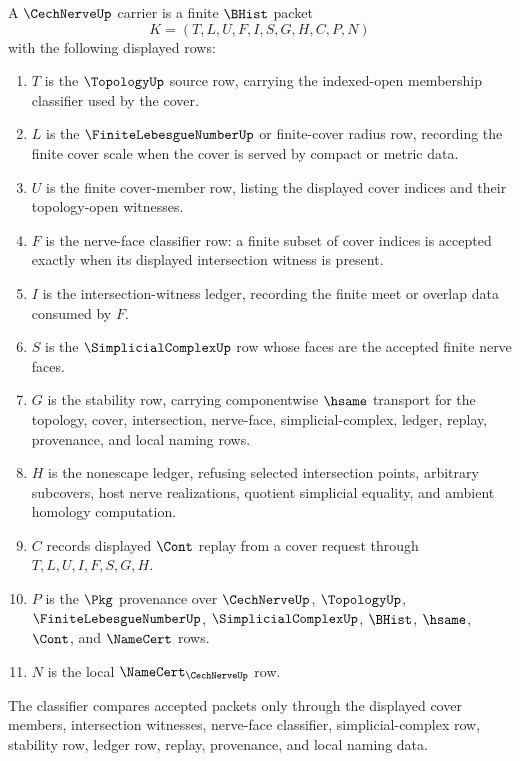 \begin{definition}
\label{def:cech-nerve-carrier}
A $\CechNerveUp$ carrier is a finite $\BHist$ packet
$$
K=(T,L,U,F,I,S,G,H,C,P,N)
$$
with the following displayed rows:
\begin{enumerate}
\item $T$ is the $\TopologyUp$ source row, carrying the indexed-open membership classifier used by the cover.
\item $L$ is the $\FiniteLebesgueNumberUp$ or finite-cover radius row, recording the finite cover scale when the cover is served by compact or metric data.
\item $U$ is the finite cover-member row, listing the displayed cover indices and their topology-open witnesses.
\item $F$ is the nerve-face classifier row: a finite subset of cover indices is accepted exactly when its displayed intersection witness is present.
\item $I$ is the intersection-witness ledger, recording the finite meet or overlap data consumed by $F$.
\item $S$ is the $\SimplicialComplexUp$ row whose faces are the accepted finite nerve faces.
\item $G$ is the stability row, carrying componentwise $\hsame$ transport for the topology, cover, intersection, nerve-face, simplicial-complex, ledger, replay, provenance, and local naming rows.
\item $H$ is the nonescape ledger, refusing selected intersection points, arbitrary subcovers, host nerve realizations, quotient simplicial equality, and ambient homology computation.
\item $C$ records displayed $\Cont$ replay from a cover request through $T,L,U,I,F,S,G,H$.
\item $P$ is the $\Pkg$ provenance over $\CechNerveUp$, $\TopologyUp$, $\FiniteLebesgueNumberUp$, $\SimplicialComplexUp$, $\BHist$, $\hsame$, $\Cont$, and $\NameCert$ rows.
\item $N$ is the local $\NameCert_{\CechNerveUp}$ row.
\end{enumerate}
The classifier compares accepted packets only through the displayed cover members, intersection witnesses, nerve-face classifier, simplicial-complex row, stability row, ledger row, replay, provenance, and local naming data.
\end{definition}

